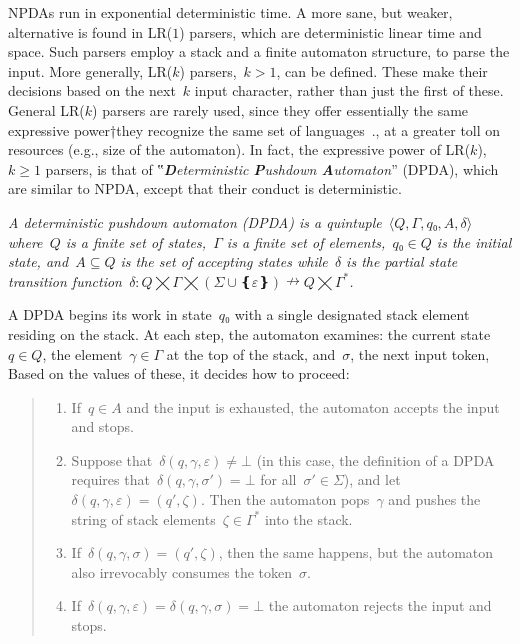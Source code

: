 NPDAs run in exponential deterministic time.
 A more sane, but weaker, alternative is found in LR($1$) parsers,
  which are deterministic linear time and space.
Such parsers employ a stack and a finite automaton structure,
  to parse the input.
 More generally, LR($k$) parsers,~$k>1$, can be defined. These make their
 decisions based on the next~$k$ input character, rather than just the first of these.
 General LR($k$) parsers are rarely used, since they offer essentially
 the same expressive power†{they recognize the same set of languages~\cite{Knuth:65}.},
 at a greater toll on resources (e.g., size of the automaton).
In fact, the expressive power of LR($k$),~$k\ge1$ parsers, is that
 of ‟\emph{\textbf Deterministic \textbf Pushdown \textbf Automaton}” (DPDA),
  which are similar to NPDA, except that their conduct is deterministic.

\begin{Definition}
  \label{Definition:DPDA}
  \slshape
  A \textit{deterministic pushdown automaton} (DPDA) is a quintuple~$⟨Q,Γ,q₀,A,δ⟩$
  where~$Q$ is a finite set of \emph{states},~$Γ$ is a finite
  \emph{set of elements},~$q₀∈Q$ is the initial state,
  and~$A⊆Q$ is the \emph{set of accepting states} while~$δ$ is
  the \emph{partial state transition function}~$δ:Q⨉Γ⨉(Σ∪❴ε❵)↛Q⨉Γ^*$.
  \par
  A DPDA begins its work in state~$q₀$ with a single designated stack element residing on the stack.
  At each step, the automaton examines: the current state~$q∈Q$, 
  the element~$γ∈Γ$ at the top of the stack, and~$σ$, the next input token, 
  Based on the values of these, it decides how to proceed:
  \begin{quote}
  \begin{enumerate}
    \item If~$q∈A$ and the input is exhausted, the automaton accepts the input and stops.
    \item Suppose that~$δ(q,γ,ε)≠⊥$ (in this case, the definition of a DPDA
          requires that~$δ(q,γ,σ')=⊥$ for all~$σ'∈Σ$), and let~$δ(q,γ,ε)=(q',ζ)$.
          Then the automaton pops~$γ$ and pushes the string of stack
          elements~$ζ∈Γ^*$ into the stack.
    \item If~$δ(q,γ,σ)=(q',ζ)$, then the same happens, but the automaton also
          irrevocably consumes the token~$σ$.
    \item If~$δ(q,γ,ε)=δ(q,γ,σ)=⊥$ the automaton rejects the input and stops.
  \end{enumerate}
  \end{quote}
\end{Definition}

